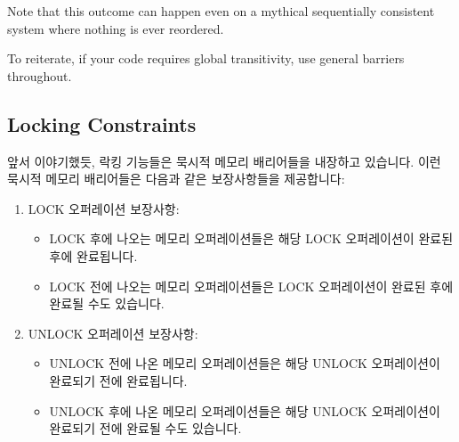\begin{enumerate}
Note that this outcome can happen even on a mythical sequentially
consistent system where nothing is ever reordered.

To reiterate, if your code requires global transitivity, use general
barriers throughout.

\subsection{Locking Constraints}
\label{sec:advsync:Locking Constraints}

앞서 이야기했듯, 락킹 기능들은 묵시적 메모리 배리어들을 내장하고 있습니다.
이런 묵시적 메모리 배리어들은 다음과 같은 보장사항들을 제공합니다:
\begin{enumerate}
\item	LOCK 오퍼레이션 보장사항:
	\begin{itemize}
	\item	LOCK 후에 나오는 메모리 오퍼레이션들은 해당 LOCK 오퍼레이션이
		완료된 후에 완료됩니다.
	\item	LOCK 전에 나오는 메모리 오퍼레이션들은 LOCK 오퍼레이션이 완료된
		후에 완료될 수도 있습니다.
	\end{itemize}
\item	UNLOCK 오퍼레이션 보장사항:
	\begin{itemize}
	\item	UNLOCK 전에 나온 메모리 오퍼레이션들은 해당 UNLOCK 오퍼레이션이
		완료되기 전에 완료됩니다.
	\item	UNLOCK 후에 나온 메모리 오퍼레이션들은 해당 UNLOCK 오퍼레이션이
		완료되기 전에 완료될 수도 있습니다.
	\end{itemize}
\iffalse


\end{enumerate}
\end{enumerate}
